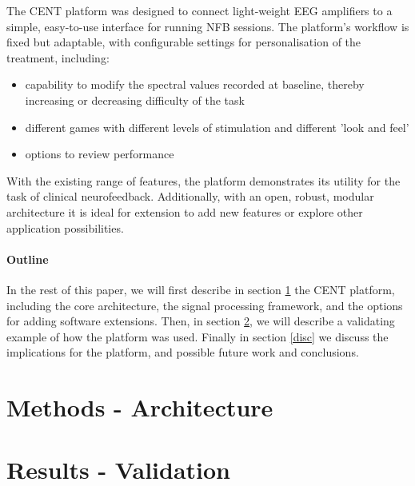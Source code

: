 \documentclass[fleqn,10pt]{wlpeerj}
\begin{document}
The CENT platform was designed to connect light-weight EEG amplifiers to a simple, easy-to-use interface for running NFB sessions. The platform's workflow is fixed but adaptable, with configurable settings for personalisation of the treatment, including:
\begin{itemize}
	\item capability to modify the spectral values recorded at baseline, thereby increasing or decreasing difficulty of the task
	\item different games with different levels of stimulation and different 'look and feel'
	\item options to review performance
\end{itemize}

With the existing range of features, the platform demonstrates its utility for the task of clinical neurofeedback. Additionally, with an open, robust, modular architecture it is ideal for extension to add new features or explore other application possibilities.

\paragraph{Outline}
In the rest of this paper, we will first describe in section \ref{methods} the CENT platform, including the core architecture, the signal processing framework, and the options for adding software extensions. Then, in section \ref{cent:trial}, we will describe a validating example of how the platform was used. Finally in section \ref{disc} we discuss the implications for the platform, and possible future work and conclusions.



\section{Methods - Architecture}
\label{methods}












\section{Results - Validation}
\label{cent:trial}
\end{document}
